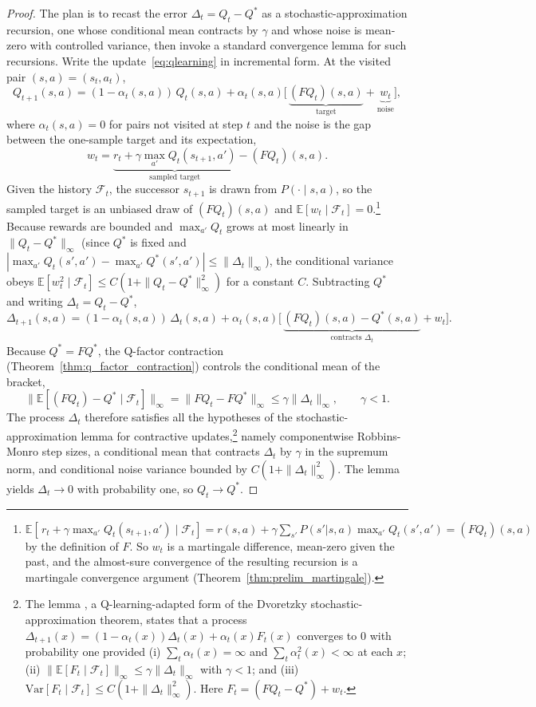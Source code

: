 \begin{proof}
The plan is to recast the error $\Delta_t = Q_t - Q^*$ as a stochastic-approximation recursion, one whose conditional mean contracts by $\gamma$ and whose noise is mean-zero with controlled variance, then invoke a standard convergence lemma for such recursions. Write the update~\eqref{eq:qlearning} in incremental form. At the visited pair $(s,a) = (s_t, a_t)$,
\[
Q_{t+1}(s,a) = (1 - \alpha_t(s,a))\, Q_t(s,a) + \alpha_t(s,a)\big[\, \underbrace{(FQ_t)(s,a)}_{\text{target}} + \underbrace{w_t}_{\text{noise}} \big],
\]
where $\alpha_t(s,a) = 0$ for pairs not visited at step $t$ and the noise is the gap between the one-sample target and its expectation,
\[
w_t = \underbrace{r_t + \gamma \max_{a'} Q_t(s_{t+1}, a')}_{\text{sampled target}} - (FQ_t)(s,a).
\]
Given the history $\mathcal{F}_t$, the successor $s_{t+1}$ is drawn from $P(\cdot \mid s,a)$, so the sampled target is an unbiased draw of $(FQ_t)(s,a)$ and $\mathbb{E}[w_t \mid \mathcal{F}_t] = 0$.\footnote{$\mathbb{E}[\,r_t + \gamma \max_{a'} Q_t(s_{t+1},a') \mid \mathcal{F}_t] = r(s,a) + \gamma \sum_{s'} P(s'|s,a) \max_{a'} Q_t(s',a') = (FQ_t)(s,a)$ by the definition of $F$. So $w_t$ is a martingale difference, mean-zero given the past, and the almost-sure convergence of the resulting recursion is a martingale convergence argument (Theorem~\ref{thm:prelim_martingale}).} Because rewards are bounded and $\max_{a'} Q_t$ grows at most linearly in $\|Q_t - Q^*\|_\infty$ (since $Q^*$ is fixed and $|\max_{a'} Q_t(s',a') - \max_{a'} Q^*(s',a')| \leq \|\Delta_t\|_\infty$), the conditional variance obeys $\mathbb{E}[w_t^2 \mid \mathcal{F}_t] \leq C(1 + \|Q_t - Q^*\|_\infty^2)$ for a constant $C$. Subtracting $Q^*$ and writing $\Delta_t = Q_t - Q^*$,
\[
\Delta_{t+1}(s,a) = (1 - \alpha_t(s,a))\, \Delta_t(s,a) + \alpha_t(s,a)\big[\, \underbrace{(FQ_t)(s,a) - Q^*(s,a)}_{\text{contracts } \Delta_t} + w_t \big].
\]
Because $Q^* = FQ^*$, the Q-factor contraction (Theorem~\ref{thm:q_factor_contraction}) controls the conditional mean of the bracket,
\[
\big\|\mathbb{E}[(FQ_t) - Q^* \mid \mathcal{F}_t]\big\|_\infty = \|FQ_t - FQ^*\|_\infty \leq \gamma \|\Delta_t\|_\infty, \qquad \gamma < 1 .
\]
The process $\Delta_t$ therefore satisfies all the hypotheses of the stochastic-approximation lemma for contractive updates,\footnote{The lemma \citep[Theorem~1]{jaakkola1994}, a Q-learning-adapted form of the Dvoretzky stochastic-approximation theorem, states that a process $\Delta_{t+1}(x) = (1 - \alpha_t(x))\Delta_t(x) + \alpha_t(x) F_t(x)$ converges to $0$ with probability one provided (i) $\sum_t \alpha_t(x) = \infty$ and $\sum_t \alpha_t^2(x) < \infty$ at each $x$; (ii) $\|\mathbb{E}[F_t \mid \mathcal{F}_t]\|_\infty \leq \gamma \|\Delta_t\|_\infty$ with $\gamma < 1$; and (iii) $\mathrm{Var}[F_t \mid \mathcal{F}_t] \leq C(1 + \|\Delta_t\|_\infty^2)$. Here $F_t = (FQ_t - Q^*) + w_t$.} namely componentwise Robbins-Monro step sizes, a conditional mean that contracts $\Delta_t$ by $\gamma$ in the supremum norm, and conditional noise variance bounded by $C(1 + \|\Delta_t\|_\infty^2)$. The lemma yields $\Delta_t \to 0$ with probability one, so $Q_t \to Q^*$.
\end{proof}

